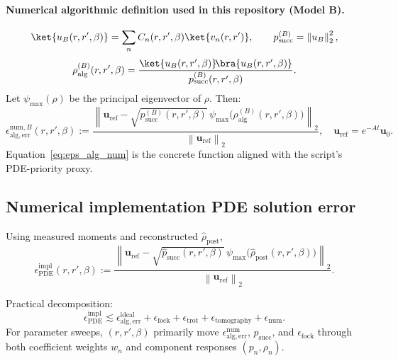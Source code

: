 \documentclass[11pt]{article}
\newcommand{\norm}[1]{\left\lVert #1 \right\rVert}
\begin{document}
\paragraph{Numerical algorithmic definition used in this repository (Model B).}
\[
\ket{u_B(r,r',\beta)}=\sum_n C_n(r,r',\beta)\ket{v_n(r,r')},\qquad
p_{\mathrm{succ}}^{(B)}=\norm{u_B}_2^2,
\]
\[
\rho_{\mathrm{alg}}^{(B)}(r,r',\beta)
=
\frac{\ket{u_B(r,r',\beta)}\!\bra{u_B(r,r',\beta)}}{p_{\mathrm{succ}}^{(B)}(r,r',\beta)}.
\]
Let \(\psi_{\max}(\rho)\) be the principal eigenvector of \(\rho\). Then:
\begin{equation}
\epsilon_{\mathrm{alg,err}}^{\mathrm{num},B}(r,r',\beta)
:=
\frac{\norm{
\mathbf u_{\mathrm{ref}}
-\sqrt{p_{\mathrm{succ}}^{(B)}(r,r',\beta)}\,
\psi_{\max}\!\big(\rho_{\mathrm{alg}}^{(B)}(r,r',\beta)\big)
}_2}{\norm{\mathbf u_{\mathrm{ref}}}_2},
\quad
\mathbf u_{\mathrm{ref}}=e^{-At}\mathbf u_0.
\label{eq:eps_alg_num}
\end{equation}
Equation~\eqref{eq:eps_alg_num} is the concrete function aligned with the script's PDE-priority proxy.

\subsection{Numerical implementation PDE solution error}
Using measured moments and reconstructed \(\hat\rho_{\mathrm{post}}\),
\begin{equation}
\epsilon_{\mathrm{PDE}}^{\mathrm{impl}}(r,r',\beta)
:=
\frac{\norm{
\mathbf u_{\mathrm{ref}}
-\sqrt{\hat p_{\mathrm{succ}}(r,r',\beta)}\,
\psi_{\max}\!\big(\hat\rho_{\mathrm{post}}(r,r',\beta)\big)
}_2}{\norm{\mathbf u_{\mathrm{ref}}}_2}.
\label{eq:eps_impl}
\end{equation}

Practical decomposition:
\[
\epsilon_{\mathrm{PDE}}^{\mathrm{impl}}
\lesssim
\epsilon_{\mathrm{alg,err}}^{\mathrm{ideal}}
+\epsilon_{\mathrm{fock}}
+\epsilon_{\mathrm{trot}}
+\epsilon_{\mathrm{tomography}}
+\epsilon_{\mathrm{num}}.
\]
For parameter sweeps, \((r,r',\beta)\) primarily move
\(\epsilon_{\mathrm{alg,err}}^{\mathrm{num}}\), \(p_{\mathrm{succ}}\), and \(\epsilon_{\mathrm{fock}}\) through
both coefficient weights \(w_n\) and component responses \((p_n,\rho_n)\).
\end{document}
